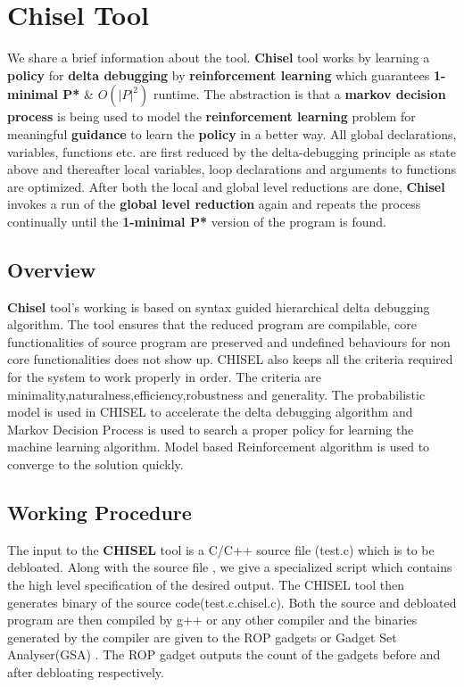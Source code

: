 \documentclass{relatorio}
\begin{document}
\section{Chisel Tool}%
\label{Tools}

We share a brief information about the tool. \textbf{Chisel} tool works by learning a \textbf{policy} for \textbf{delta debugging} by \textbf{reinforcement learning} which guarantees \textbf{1-minimal P*} \& $\textbf{$O(|P|^2)$}$ runtime. The abstraction is that a \textbf{markov decision process} is being used to model the \textbf{reinforcement learning} problem for meaningful \textbf{guidance} to learn the \textbf{policy} in a better way. All global declarations, variables, functions etc. are first reduced by the delta-debugging principle as state above and thereafter local variables, loop declarations and arguments to functions are optimized. After both the local and global level reductions are done, \textbf{Chisel} invokes a run of the \textbf{global level reduction} again and repeats the process continually until the \textbf{1-minimal P*} version of the program is found. 

\subsection{Overview}%
\label{Tools}

\textbf{Chisel} tool's working is based on syntax guided hierarchical delta debugging algorithm. The tool ensures that the reduced program are compilable, core functionalities of source program are preserved  and undefined behaviours for non core functionalities does not show up. CHISEL also keeps all the criteria required for the system to work properly in order. The criteria are minimality,naturalness,efficiency,robustness and generality. The probabilistic model is used in CHISEL to accelerate the delta debugging algorithm and Markov Decision Process is used to search a proper policy for learning the machine learning algorithm. Model based Reinforcement algorithm is used to converge to the solution quickly.

\subsection{Working Procedure}%
\label{Tools}

The input to the \textbf{CHISEL} tool is a C/C++ source file (test.c) which is to be debloated. Along with the source file , we give a specialized script which contains the high level specification of the desired output. The CHISEL tool then generates binary of the source code(test.c.chisel.c). Both the source and debloated program are then compiled by g++ or any other compiler and the binaries generated by the compiler are given to the ROP gadgets or Gadget Set Analyser(GSA) . The ROP gadget outputs the count of the  gadgets before and after debloating respectively.
\end{document}
